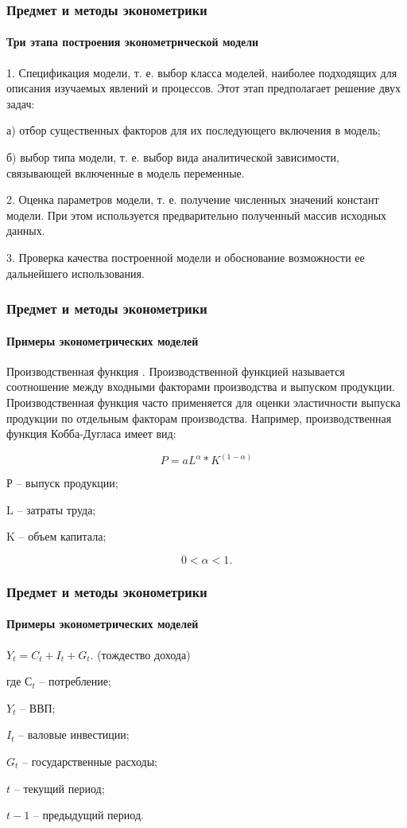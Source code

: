 \documentclass[10pt,pdf,hyperref={unicode}]{beamer}
\begin{document}
\begin{frame}
\frametitle{Предмет и методы эконометрики} 
\framesubtitle{Три этапа построения эконометрической модели}

1. Спецификация модели, т. е. выбор класса моделей, наиболее 
подходящих для описания изучаемых явлений и процессов. 
Этот этап предполагает решение двух задач:

а) отбор существенных факторов для их последующего включения в модель;

б) выбор типа модели, т. е. выбор вида аналитической зависимости, 
связывающей включенные в модель переменные.

2. Оценка параметров модели, т. е. получение численных значений 
констант модели. При этом используется предварительно 
полученный массив исходных данных.

3. Проверка качества построенной модели и обоснование возможности ее
дальнейшего использования.

\end{frame}


\begin{frame}
\frametitle{Предмет и методы эконометрики} 
\framesubtitle{Примеры эконометрических моделей}

Производственная функция . Производственной функцией называется 
соотношение между входными факторами производства и выпуском продукции.
Производственная функция часто применяется для оценки эластичности 
выпуска продукции по отдельным факторам производства. 
Например, производственная функция Кобба-Дугласа имеет вид:

$$ P= a L^\alpha * K^{(1-\alpha)} $$

Р – выпуск продукции;

L – затраты труда;

K – объем капитала;

$$0<\alpha< 1.$$




\end{frame}



\begin{frame}
\frametitle{Предмет и методы эконометрики} 
\framesubtitle{Примеры эконометрических моделей}


$Y_t= C_t + I_t +G_t.$ (тождество дохода)

где $С_t$ – потребление;

$Y_t$ – ВВП;

$I_t$ – валовые инвестиции;

$G_t$ – государственные расходы;

$t$ – текущий период;

$t-1$ – предыдущий период.


\end{frame}
\end{document}
